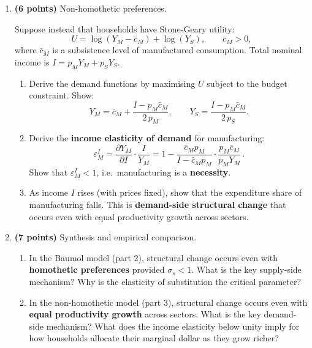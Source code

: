 \documentclass[a4paper,11pt]{article}
\begin{document}
\begin{enumerate}[label=\textbf{\arabic*.}, leftmargin=*, itemsep=6pt]
    \item \textbf{(6 points)} Non-homothetic preferences.

    Suppose instead that households have Stone-Geary utility:
    \[
        U = \log(Y_M - \bar{c}_M) + \log(Y_S), \qquad \bar{c}_M > 0,
    \]
    where $\bar{c}_M$ is a subsistence level of manufactured consumption.  Total
    nominal income is $I = p_M Y_M + p_S Y_S$.

    \begin{enumerate}[label=(\alph*), itemsep=4pt]
        \item Derive the demand functions by maximising $U$ subject to the budget
        constraint.  Show:
        \[
            Y_M = \bar{c}_M + \frac{I - p_M \bar{c}_M}{2\,p_M},
            \qquad
            Y_S = \frac{I - p_M \bar{c}_M}{2\,p_S}.
        \]
        \item Derive the \textbf{income elasticity of demand} for manufacturing:
        \[
            \varepsilon_M^I = \frac{\partial Y_M}{\partial I}\cdot\frac{I}{Y_M}
            = 1 - \frac{\bar{c}_M p_M}{I - \bar{c}_M p_M} \cdot \frac{p_M \bar{c}_M}{p_M Y_M} \,.
        \]
        Show that $\varepsilon_M^I < 1$, i.e.\ manufacturing is a \textbf{necessity}.
        \item As income $I$ rises (with prices fixed), show that the expenditure share of
        manufacturing falls.  This is \textbf{demand-side structural change} that occurs
        even with equal productivity growth across sectors.
    \end{enumerate}

    \item \textbf{(7 points)} Synthesis and empirical comparison.

    \begin{enumerate}[label=(\alph*), itemsep=4pt]
        \item In the Baumol model (part 2), structural change occurs even with
        \textbf{homothetic preferences} provided $\sigma_s < 1$.  What is the key
        supply-side mechanism?  Why is the elasticity of substitution the critical
        parameter?

        \item In the non-homothetic model (part 3), structural change occurs even with
        \textbf{equal productivity growth} across sectors.  What is the key demand-side
        mechanism?  What does the income elasticity below unity imply for how households
        allocate their marginal dollar as they grow richer?


\end{enumerate}
\end{enumerate}
\end{document}
